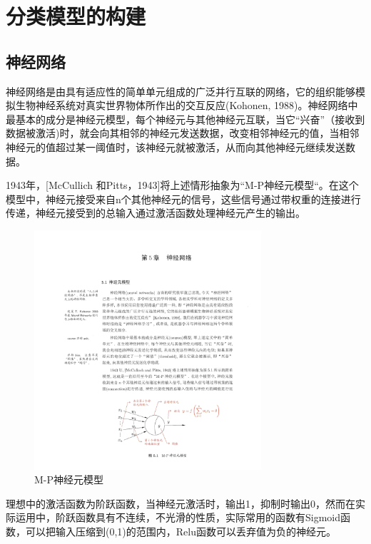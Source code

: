 \section{分类模型的构建}
\subsection{神经网络}
神经网络是由具有适应性的简单单元组成的广泛并行互联的网络，它的组织能够模拟生物神经系统对真实世界物体所作出的交互反应(Kohonen, 1988)。神经网络中最基本的成分是神经元模型，每个神经元与其他神经元互联，当它“兴奋”（接收到数据被激活)时，就会向其相邻的神经元发送数据，改变相邻神经元的值，当相邻神经元的值超过某一阈值时，该神经元就被激活，从而向其他神经元继续发送数据。
\par 1943年，[McCullich 和Pitts，1943]将上述情形抽象为“M-P神经元模型“。在这个模型中，神经元接受来自n个其他神经元的信号，这些信号通过带权重的连接进行传递，神经元接受到的总输入通过激活函数处理神经元产生的输出。
\begin{figure}[htbp]
\begin{center}
\includegraphics[width=0.75\textwidth]{figures//2.pdf}
\caption{M-P神经元模型}
\label{default}
\end{center}
\end{figure}
\par 理想中的激活函数为阶跃函数，当神经元激活时，输出1，抑制时输出0，然而在实际运用中，阶跃函数具有不连续，不光滑的性质，实际常用的函数有Sigmoid函数，可以把输入压缩到(0,1)的范围内，Relu函数可以丢弃值为负的神经元。

